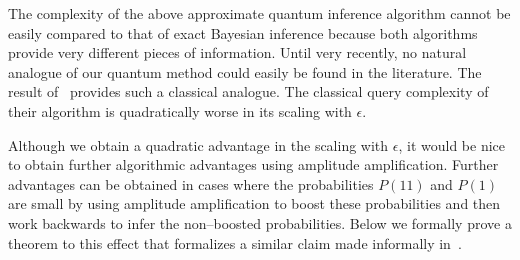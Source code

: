 \documentclass[aps,amsmath,onecolumn,amssymb]{revtex4}
\begin{document}
The complexity of the above approximate quantum inference algorithm cannot be easily compared to that of exact Bayesian inference because both algorithms
provide very different pieces of information.  Until very recently,
no natural analogue of our quantum method could easily be found in the literature.  The result of~\cite{wiebe2015bayesian} provides such a classical analogue.  The classical query complexity of their algorithm is quadratically worse in its scaling with $\epsilon$.

Although we obtain a quadratic advantage in the scaling with $\epsilon$, it would be nice to obtain further algorithmic advantages using amplitude amplification.  Further advantages can be obtained in cases where the probabilities $P(11)$ and $P(1)$ are small by using amplitude amplification to boost these probabilities and then work backwards to infer the non--boosted probabilities.  Below we formally prove a theorem to this effect that formalizes a similar claim made informally in~\cite{WHW15}.
\end{document}
